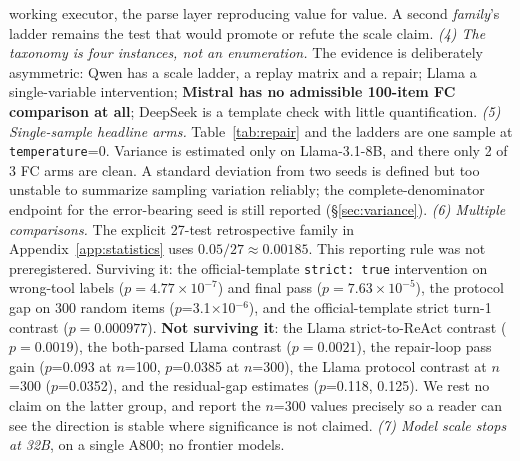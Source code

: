 working executor, the parse layer reproducing value for value. A second \emph{family}'s ladder
remains the test that would promote or refute the scale claim.
\emph{(4) The taxonomy is four instances, not an enumeration.} The evidence is deliberately
asymmetric: Qwen has a scale ladder, a replay matrix and a repair; Llama a single-variable
intervention; \textbf{Mistral has no admissible 100-item FC comparison at all}; DeepSeek is a
template check with little quantification.
\emph{(5) Single-sample headline arms.} Table~\ref{tab:repair} and the ladders are one sample at
\texttt{temperature}=0. Variance is estimated only on Llama-3.1-8B, and there only 2 of 3 FC arms
are clean. A standard deviation from two seeds is defined but too unstable to summarize sampling
variation reliably; the complete-denominator endpoint for the error-bearing seed is still
reported (\S\ref{sec:variance}).
\emph{(6) Multiple comparisons.} The explicit 27-test retrospective family in Appendix~\ref{app:statistics} uses
$0.05/27\approx0.00185$. This reporting rule was not preregistered. Surviving it: the official-template \texttt{strict: true}
intervention on wrong-tool labels ($p=4.77\times10^{-7}$) and final pass
($p=7.63\times10^{-5}$), the protocol gap on 300 random items ($p$=3.1$\times$10$^{-6}$), and the official-template strict turn-1 contrast ($p=0.000977$). \textbf{Not surviving it}: the Llama strict-to-ReAct contrast ($p=0.0019$),
the both-parsed Llama contrast ($p=0.0021$), the repair-loop pass gain ($p$=0.093 at
$n$=100, $p$=0.0385 at $n$=300), the Llama protocol contrast at $n$=300 ($p$=0.0352), and the
residual-gap estimates ($p$=0.118, 0.125). We rest no claim on the latter group, and report the
$n$=300 values precisely so a reader can see the direction is stable where significance is not
claimed.
\emph{(7) Model scale stops at 32B}, on a single A800; no frontier models.

